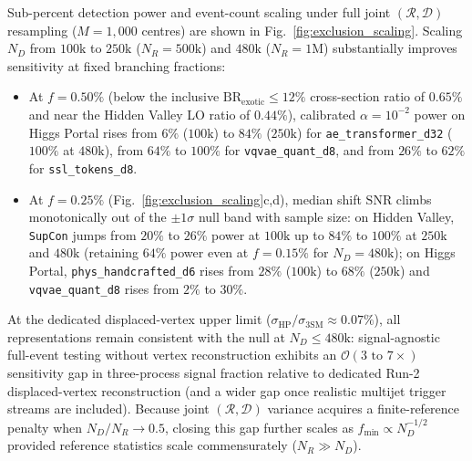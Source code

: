 \documentclass{article}
\begin{document}
\begin{dmbox}
Sub-percent detection power and event-count scaling under full joint $(\mathcal{R}, \mathcal{D})$ resampling ($M = 1,000$ centres) are shown in Fig.~\ref{fig:exclusion_scaling}. Scaling $N_D$ from $100\text{k}$ to $250\text{k}$ ($N_R = 500\text{k}$) and $480\text{k}$ ($N_R = 1\text{M}$) substantially improves sensitivity at fixed branching fractions:
\begin{itemize}
    \item At $f = 0.50\%$ (below the inclusive $\text{BR}_{\text{exotic}} \le 12\%$ cross-section ratio of $0.65\%$ and near the Hidden Valley LO ratio of $0.44\%$), calibrated $\alpha = 10^{-2}$ power on Higgs Portal rises from $6\%$ ($100\text{k}$) to $84\%$ ($250\text{k}$) for \texttt{ae\_transformer\_d32} ($100\%$ at $480\text{k}$), from $64\%$ to $100\%$ for \texttt{vqvae\_quant\_d8}, and from $26\%$ to $62\%$ for \texttt{ssl\_tokens\_d8}.
    \item At $f = 0.25\%$ (Fig.~\ref{fig:exclusion_scaling}c,d), median shift $\text{SNR}$ climbs monotonically out of the $\pm 1\sigma$ null band with sample size: on Hidden Valley, \texttt{SupCon} jumps from $20\%$ to $26\%$ power at $100\text{k}$ up to $84\%$ to $100\%$ at $250\text{k}$ and $480\text{k}$ (retaining $64\%$ power even at $f = 0.15\%$ for $N_D = 480\text{k}$); on Higgs Portal, \texttt{phys\_handcrafted\_d6} rises from $28\%$ ($100\text{k}$) to $68\%$ ($250\text{k}$) and \texttt{vqvae\_quant\_d8} rises from $2\%$ to $30\%$.
\end{itemize}
At the dedicated displaced-vertex upper limit ($\sigma_{\text{HP}} / \sigma_{\text{3SM}} \approx 0.07\%$), all representations remain consistent with the null at $N_D \le 480\text{k}$: signal-agnostic full-event testing without vertex reconstruction exhibits an $\mathcal{O}(3\text{ to }7\times)$ sensitivity gap in three-process signal fraction relative to dedicated Run-2 displaced-vertex reconstruction (and a wider gap once realistic multijet trigger streams are included). Because joint $(\mathcal{R}, \mathcal{D})$ variance acquires a finite-reference penalty when $N_D / N_R \to 0.5$, closing this gap further scales as $f_{\text{min}} \propto N_D^{-1/2}$ provided reference statistics scale commensurately ($N_R \gg N_D$).
\end{dmbox}
\end{document}
